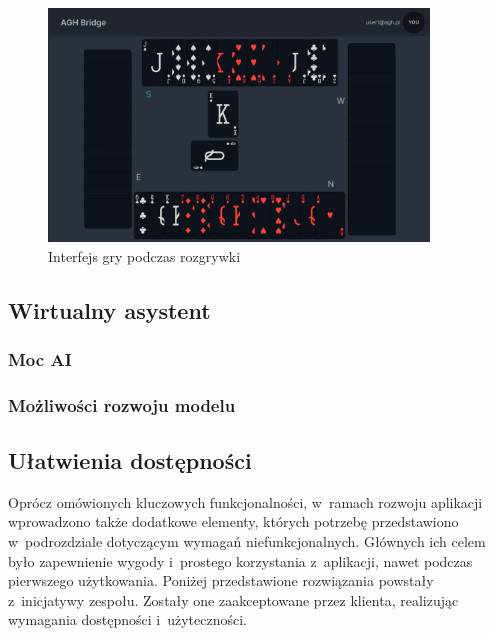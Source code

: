 \begin{figure}[h!]
  \centering
  \includegraphics[width=0.9\textwidth]{img/widoki/game.png}
  \caption{Interfejs gry podczas rozgrywki}
  \label{fig:game}
\end{figure}

\FloatBarrier

\subsection{Wirtualny asystent}

\subsubsection{Moc AI}
\label{subsubsec:mocai}

\subsubsection{Możliwości rozwoju modelu}

\subsection{Ułatwienia dostępności}

Oprócz omówionych kluczowych funkcjonalności, w~ramach rozwoju
aplikacji wprowadzono także dodatkowe elementy, których
potrzebę przedstawiono w~podrozdziale dotyczącym wymagań
niefunkcjonalnych. Głównych ich celem było zapewnienie
wygody i~prostego korzystania z~aplikacji, nawet podczas
pierwszego użytkowania. Poniżej przedstawione rozwiązania powstały
z~inicjatywy zespołu. Zostały one zaakceptowane przez klienta,
realizując wymagania dostępności i~użyteczności.


